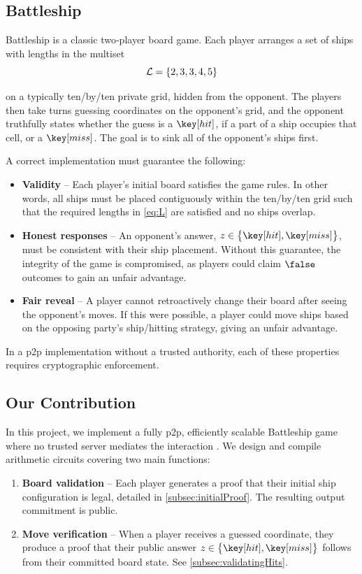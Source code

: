 \subsection{Battleship}
\label{subsec:battleship}

Battleship is a classic two‑player board game. Each player arranges a set of ships with lengths in the multiset
\begin{equation}\label{eq:L}
    \mathcal{L} = \set{2, 3, 3, 4, 5}
\end{equation}

\noindent on a typically ten\-/by\-/ten private grid, hidden from the opponent. The players then take turns guessing coordinates on the opponent's grid, and the opponent truthfully states whether the guess is a $\hit$, if a part of a ship occupies that cell, or a $\miss$. The goal is to sink all of the opponent's ships first.

A correct implementation must guarantee the following:
\begin{itemize}
    \item \textbf{Validity} \--- Each player's initial board satisfies the game rules. In other words, all ships must be placed contiguously within the ten\-/by\-/ten grid such that the required lengths in \cref{eq:L} are satisfied and no ships overlap.
    \item \textbf{Honest responses} \--- An opponent's answer, $z \in \set{\hit, \miss}$, must be consistent with their ship placement. Without this guarantee, the integrity of the game is compromised, as players could claim $\false$ outcomes to gain an unfair advantage.
    \item \textbf{Fair reveal} \--- A player cannot retroactively change their board after seeing the opponent's moves. If this were possible, a player could move ships based on the opposing party's ship\-/hitting strategy, giving an unfair advantage.
\end{itemize}

In a \gls{p2p} implementation without a trusted authority, each of these properties requires cryptographic enforcement.

\subsection{Our Contribution}

In this project, we implement a fully \gls{p2p}, efficiently scalable Battleship game where no trusted server mediates the interaction \cite{zkBattleship}. We design and compile arithmetic circuits covering two main functions:
\begin{enumerate}
    \item \textbf{Board validation} \--- Each player generates a proof that their initial ship configuration is legal, detailed in \cref{subsec:initialProof}. The resulting output commitment is public.
    \item \textbf{Move verification} \--- When a player receives a guessed coordinate, they produce a proof that their public answer $z \in \set{\hit, \miss}$ follows from their committed board state. See \cref{subsec:validatingHits}.
\end{enumerate}

